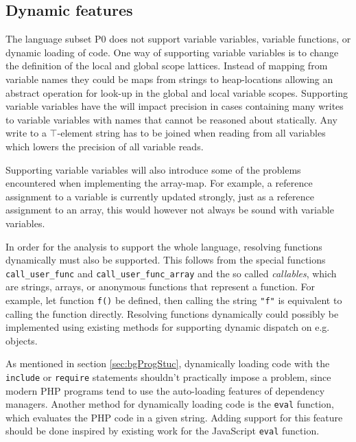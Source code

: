 \subsection{Dynamic features}
The language subset P0 does not support variable variables, variable functions, or dynamic loading of code. One way of supporting variable variables is to change the definition of the local and global scope lattices. Instead of mapping from variable names they could be maps from strings to heap-locations allowing an abstract operation for look-up in the global and local variable scopes. Supporting variable variables have the will impact precision in cases containing many writes to variable variables with names that cannot be reasoned about statically. Any write to a $\top$-element string has to be joined when reading from all variables which lowers the precision of all variable reads.

Supporting variable variables will also introduce some of the problems encountered when implementing the array-map. For example, a reference assignment to a variable is currently updated strongly, just as a reference assignment to an array, this would however not always be sound with variable variables.

In order for the analysis to support the whole language, resolving functions dynamically must also be supported. This follows from the special functions \texttt{call\_user\_func} and \texttt{call\_user\_func\_array} and the so called \emph{callables}, which are strings, arrays, or anonymous functions that represent a function. For example, let function \texttt{f()} be defined, then calling the string \texttt{"f"} is equivalent to calling the function directly. Resolving functions dynamically could possibly be implemented using existing methods for supporting dynamic dispatch on e.g. objects.

As mentioned in section \ref{sec:bgProgStuc}, dynamically loading code with the \texttt{include} or \texttt{require} statements shouldn't practically impose a problem, since modern PHP programs tend to use the auto-loading features of dependency managers. Another method for dynamically loading code is the \texttt{eval} function, which evaluates the PHP code in a given string. Adding support for this feature should be done inspired by existing work for the JavaScript \texttt{eval} function.

